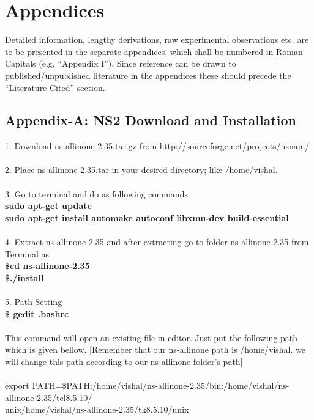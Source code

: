 \chapter*{Appendices}
Detailed information, lengthy derivations, raw experimental observations etc. are to be
presented in the separate appendices, which shall be numbered in Roman Capitals (e.g.
“Appendix I”). Since reference can be drawn to published/unpublished literature in the
appendices these should precede the “Literature Cited” section.\\

\section*{Appendix-A: NS2 Download and Installation}
1. Download ns-allinone-2.35.tar.gz from http://sourceforge.net/projects/nsnam/\\
\\
2. Place ns-allinone-2.35.tar in your desired directory; like /home/vishal.\\
\\
3. Go to terminal and do as following commands\\
\textbf{sudo apt-get update}\\
\textbf{sudo apt-get install automake autoconf libxmu-dev build-essential}\\
\\
4. Extract ns-allinone-2.35 and after extracting go to folder ns-allinone-2.35 from Terminal as\\
\textbf{\$cd ns-allinone-2.35}\\
\textbf{\$./install}\\
\\
5. Path Setting\\
\textbf{\$ gedit .bashrc}\\
\\
This command will open an existing file in editor. Just put the following path which is given bellow. [Remember that our ns-allinone path is /home/vishal. we will change this path according to our ns-allinone folder's path]\\
\\
export PATH=\$PATH:/home/vishal/ns-allinone-2.35/bin:/home/vishal/ns-allinone-2.35/tcl8.5.10/\\
unix/home/vishal/ns-allinone-2.35/tk8.5.10/unix\\
\\
